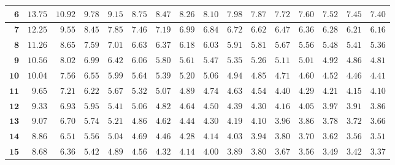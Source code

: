 \begin{customTableWrapper}{1.4}
\begin{longtable}{|r|r|r|r|r|r|r|r|r|r|r|r|r|r|r|r|}
    ${\mathbf{6}}$  & ${13.75}$   & ${10.92}$   & ${9.78}$   & ${9.15}$   & ${8.75}$   & ${8.47}$   & ${8.26}$   & ${8.10}$   & ${7.98}$   & ${7.87}$   & ${7.72}$   & ${7.60}$   & ${7.52}$   & ${7.45}$   & ${7.40}$   \\ \hline 
    ${\mathbf{7}}$  & ${12.25}$   & ${9.55}$   & ${8.45}$   & ${7.85}$   & ${7.46}$   & ${7.19}$   & ${6.99}$   & ${6.84}$   & ${6.72}$   & ${6.62}$   & ${6.47}$   & ${6.36}$   & ${6.28}$   & ${6.21}$   & ${6.16}$   \\ \hline 
    ${\mathbf{8}}$  & ${11.26}$   & ${8.65}$   & ${7.59}$   & ${7.01}$   & ${6.63}$   & ${6.37}$   & ${6.18}$   & ${6.03}$   & ${5.91}$   & ${5.81}$   & ${5.67}$   & ${5.56}$   & ${5.48}$   & ${5.41}$   & ${5.36}$   \\ \hline 
    ${\mathbf{9}}$  & ${10.56}$   & ${8.02}$   & ${6.99}$   & ${6.42}$   & ${6.06}$   & ${5.80}$   & ${5.61}$   & ${5.47}$   & ${5.35}$   & ${5.26}$   & ${5.11}$   & ${5.01}$   & ${4.92}$   & ${4.86}$   & ${4.81}$   \\ \hline 
    ${\mathbf{10}}$  & ${10.04}$   & ${7.56}$   & ${6.55}$   & ${5.99}$   & ${5.64}$   & ${5.39}$   & ${5.20}$   & ${5.06}$   & ${4.94}$   & ${4.85}$   & ${4.71}$   & ${4.60}$   & ${4.52}$   & ${4.46}$   & ${4.41}$   \\ \hline 
    ${\mathbf{11}}$  & ${9.65}$   & ${7.21}$   & ${6.22}$   & ${5.67}$   & ${5.32}$   & ${5.07}$   & ${4.89}$   & ${4.74}$   & ${4.63}$   & ${4.54}$   & ${4.40}$   & ${4.29}$   & ${4.21}$   & ${4.15}$   & ${4.10}$   \\ \hline 
    ${\mathbf{12}}$  & ${9.33}$   & ${6.93}$   & ${5.95}$   & ${5.41}$   & ${5.06}$   & ${4.82}$   & ${4.64}$   & ${4.50}$   & ${4.39}$   & ${4.30}$   & ${4.16}$   & ${4.05}$   & ${3.97}$   & ${3.91}$   & ${3.86}$   \\ \hline 
    ${\mathbf{13}}$  & ${9.07}$   & ${6.70}$   & ${5.74}$   & ${5.21}$   & ${4.86}$   & ${4.62}$   & ${4.44}$   & ${4.30}$   & ${4.19}$   & ${4.10}$   & ${3.96}$   & ${3.86}$   & ${3.78}$   & ${3.72}$   & ${3.66}$   \\ \hline 
    ${\mathbf{14}}$  & ${8.86}$   & ${6.51}$   & ${5.56}$   & ${5.04}$   & ${4.69}$   & ${4.46}$   & ${4.28}$   & ${4.14}$   & ${4.03}$   & ${3.94}$   & ${3.80}$   & ${3.70}$   & ${3.62}$   & ${3.56}$   & ${3.51}$   \\ \hline 
    ${\mathbf{15}}$  & ${8.68}$   & ${6.36}$   & ${5.42}$   & ${4.89}$   & ${4.56}$   & ${4.32}$   & ${4.14}$   & ${4.00}$   & ${3.89}$   & ${3.80}$   & ${3.67}$   & ${3.56}$   & ${3.49}$   & ${3.42}$   & ${3.37}$   \\ \hline 

\end{longtable}
\end{customTableWrapper}
